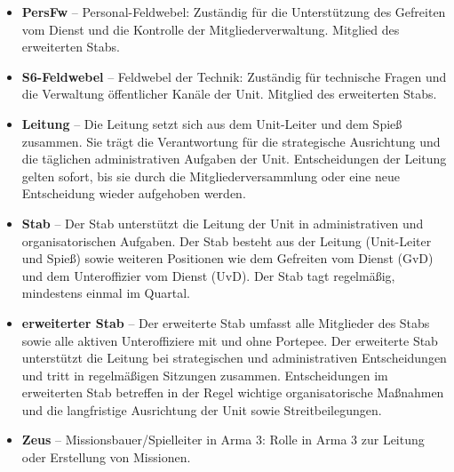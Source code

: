 \begin{itemize}
    \item \textbf{PersFw} -- Personal-Feldwebel: Zuständig für die Unterstützung des Gefreiten vom Dienst und die Kontrolle der Mitgliederverwaltung. Mitglied des erweiterten Stabs.
    \item \textbf{S6-Feldwebel} -- Feldwebel der Technik: Zuständig für technische Fragen und die Verwaltung öffentlicher Kanäle der Unit. Mitglied des erweiterten Stabs.
    \item \textbf{Leitung} -- Die Leitung setzt sich aus dem Unit-Leiter und dem Spieß zusammen. Sie trägt die Verantwortung für die strategische Ausrichtung und die täglichen administrativen Aufgaben der Unit. Entscheidungen der Leitung gelten sofort, bis sie durch die Mitgliederversammlung oder eine neue Entscheidung wieder aufgehoben werden.
    \item \textbf{Stab} -- Der Stab unterstützt die Leitung der Unit in administrativen und organisatorischen Aufgaben. Der Stab besteht aus der Leitung (Unit-Leiter und Spieß) sowie weiteren Positionen wie dem Gefreiten vom Dienst (GvD) und dem Unteroffizier vom Dienst (UvD). Der Stab tagt regelmäßig, mindestens einmal im Quartal.
    \item \textbf{erweiterter Stab} -- Der erweiterte Stab umfasst alle Mitglieder des Stabs sowie alle aktiven Unteroffiziere mit und ohne Portepee. Der erweiterte Stab unterstützt die Leitung bei strategischen und administrativen Entscheidungen und tritt in regelmäßigen Sitzungen zusammen. Entscheidungen im erweiterten Stab betreffen in der Regel wichtige organisatorische Maßnahmen und die langfristige Ausrichtung der Unit sowie Streitbeilegungen.
    \item \textbf{Zeus} -- Missionsbauer/Spielleiter in Arma 3: Rolle in Arma 3 zur Leitung oder Erstellung von Missionen.
\end{itemize}
